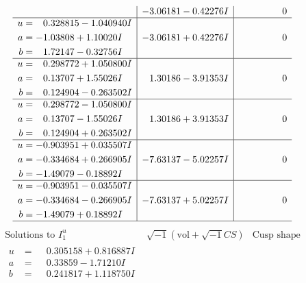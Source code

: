 \documentclass[1p]{elsarticle_modified}
\theoremstyle{definition}
\newcommand{\I}{\sqrt{-1}}
\begin{document}
$$\begin{array}{c|c|c}
 & -3.06181 - 0.42276 I & \phantom{-0.000000 } 0 \\ \hline\begin{aligned}
u &= \phantom{-}0.328815 - 1.040940 I \\
a &= -1.03808 + 1.10020 I \\
b &= \phantom{-}1.72147 - 0.32756 I\end{aligned}
 & -3.06181 + 0.42276 I & \phantom{-0.000000 } 0 \\ \hline\begin{aligned}
u &= \phantom{-}0.298772 + 1.050800 I \\
a &= \phantom{-}0.13707 + 1.55026 I \\
b &= \phantom{-}0.124904 - 0.263502 I\end{aligned}
 & \phantom{-}1.30186 - 3.91353 I & \phantom{-0.000000 } 0 \\ \hline\begin{aligned}
u &= \phantom{-}0.298772 - 1.050800 I \\
a &= \phantom{-}0.13707 - 1.55026 I \\
b &= \phantom{-}0.124904 + 0.263502 I\end{aligned}
 & \phantom{-}1.30186 + 3.91353 I & \phantom{-0.000000 } 0 \\ \hline\begin{aligned}
u &= -0.903951 + 0.035507 I \\
a &= -0.334684 + 0.266905 I \\
b &= -1.49079 - 0.18892 I\end{aligned}
 & -7.63137 - 5.02257 I & \phantom{-0.000000 } 0 \\ \hline\begin{aligned}
u &= -0.903951 - 0.035507 I \\
a &= -0.334684 - 0.266905 I \\
b &= -1.49079 + 0.18892 I\end{aligned}
 & -7.63137 + 5.02257 I & \phantom{-0.000000 } 0\\
 \hline 
 \end{array}$$\newpage$$\begin{array}{c|c|c}  
\text{Solutions to }I^u_{1}& \I (\text{vol} + \sqrt{-1}CS) & \text{Cusp shape}\\
 \hline 
\begin{aligned}
u &= \phantom{-}0.305158 + 0.816887 I \\
a &= \phantom{-}0.33859 - 1.71210 I \\
b &= \phantom{-}0.241817 + 1.118750 I\end{aligned}

\end{array}$$
\end{document}
